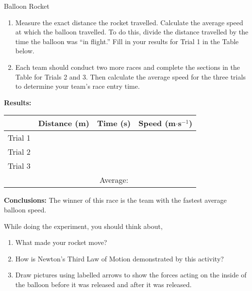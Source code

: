 \begin{g_experiment}{Balloon Rocket}
{\begin{enumerate}
\begin{enumerate}
\item Measure the exact distance the rocket travelled. Calculate the average speed at which the balloon travelled. To do this, divide the distance travelled by the time the balloon was ``in flight.'' Fill in your results for Trial 1 in the Table below.
\item Each team should conduct two more races and complete the sections in the Table for Trials 2 and 3. Then calculate the average speed for the three trials to determine your team's race entry time.
\end{enumerate}
\end{enumerate}
\textbf{Results: }
\begin{center}
\begin{tabular}{|c|c|c|c|}\hline
& \textbf{Distance (m)} & \textbf{Time (s)} & \textbf{Speed (m$\cdot$s$^{-1}$)}\\\hline
Trial 1 &&&\\\hline
Trial 2 &&&\\\hline
Trial 3 &&&\\\hline
&& Average: & \\\hline
\end{tabular}
\end{center}
\textbf{Conclusions: }
The winner of this race is the team with the fastest average balloon speed.
}
\end{g_experiment}

While doing the experiment, you should think about,
\begin{enumerate}
\item{What made your rocket move?}
\item{How is Newton's Third Law of Motion demonstrated by this activity?}
\item{Draw pictures using labelled arrows to show the forces acting on the inside of the balloon before it was released and after it was released.}
\end{enumerate}



